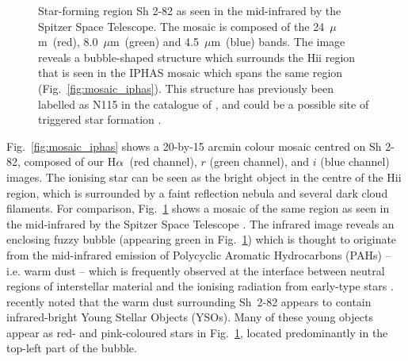 \documentclass[a4paper,useAMS,usenatbib]{mn2e}
\def\ha{\mbox{H$\rm \alpha$}}
\def\micron{\mbox{$\mu$m}}
\begin{document}
\begin{figure}
\begin{minipage}[b]{0.8\linewidth}
    \end{minipage}
    \caption{Star-forming region Sh 2-82 as seen in the mid-infrared
    by the Spitzer Space Telescope. The mosaic is composed of the 24~\micron\ (red), 8.0~\micron\ (green) and 4.5~\micron\ (blue) bands.
    The image reveals a bubble-shaped structure which surrounds the {\sc Hii} region that is seen in the IPHAS mosaic which spans the same region (Fig.~\ref{fig:mosaic_iphas}). 
    This structure has previously been labelled as N115 in the 
catalogue of \citet{Churchwell2006}, and could be a possible site of triggered star formation \citep{Thompson2012,Kendrew2012}.}
    \label{fig:mosaic_spitzer}
\end{figure}

Fig.~\ref{fig:mosaic_iphas} shows a 20-by-15 arcmin
colour mosaic centred on Sh 2-82,
composed of our \ha\ (red channel),
$r$ (green channel),
and $i$ (blue channel) images.
The ionising star can be seen as the bright object
in the centre of the H{\sc ii} region,
which is surrounded by a faint reflection nebula
and several dark cloud filaments.
For comparison, Fig.~\ref{fig:mosaic_spitzer} shows
a mosaic of the same region 
as seen in the mid-infrared by the Spitzer Space Telescope \citep{Benjamin2003,Churchwell2009}.
The infrared image reveals an enclosing fuzzy bubble (appearing
green in Fig.~\ref{fig:mosaic_spitzer})
which is thought to originate from the
mid-infrared emission of Polycyclic Aromatic Hydrocarbons (PAHs)
-- i.e. warm dust --
which is frequently observed
at the interface between neutral regions of interstellar material
and the ionising radiation from early-type stars \citep{Churchwell2006}.
\cite{Yu2012}
recently noted that the warm dust
surrounding Sh~2-82 
appears to contain infrared-bright
Young Stellar Objects (YSOs).
Many of these young objects 
appear as red- and pink-coloured stars
in Fig.~\ref{fig:mosaic_spitzer},
located predominantly in the top-left part
of the bubble.
\end{document}
